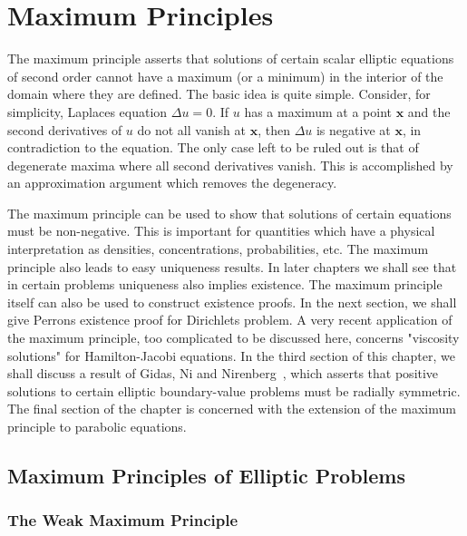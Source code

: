 \section{Maximum Principles}\label{chap:maximum-principles}

The maximum principle asserts that solutions of certain scalar elliptic equations of second order cannot have a maximum (or a minimum) in the interior of the domain where they are defined. The basic idea is quite simple. Consider, for simplicity, Laplace\textquotesingle s equation $\Delta u=0$. If $u$ has a maximum at a point $\bm{x}$ and the second derivatives of $u$ do not all vanish at $\bm{x}$, then $\Delta u$ is negative at $\bm{x}$, in contradiction to the equation. The only case left to be ruled out is that of degenerate maxima where all second derivatives vanish. This is accomplished by an approximation argument which removes the degeneracy.

The maximum principle can be used to show that solutions of certain equations must be non-negative. This is important for quantities which have a physical interpretation as densities, concentrations, probabilities, etc. The maximum principle also leads to easy uniqueness results. In later chapters we shall see that in certain problems uniqueness also implies existence. The maximum principle itself can also be used to construct existence proofs. In the next section, we shall give Perron\textquotesingle s existence proof for Dirichlet\textquotesingle s problem. A very recent application of the maximum principle, too complicated to be discussed here, concerns "viscosity solutions" for Hamilton-Jacobi equations. In the third section of this chapter, we shall discuss a result of Gidas, Ni and Nirenberg~\cite{GNN}, which asserts that positive solutions to certain elliptic boundary-value problems must be radially symmetric. The final section of the chapter is concerned with the extension of the maximum principle to parabolic equations.

\subsection{Maximum Principles of Elliptic Problems}\label{sec:elliptic-maximum-principles}

\subsubsection{The Weak Maximum Principle}\label{subsec:weak-maximum-principle}

